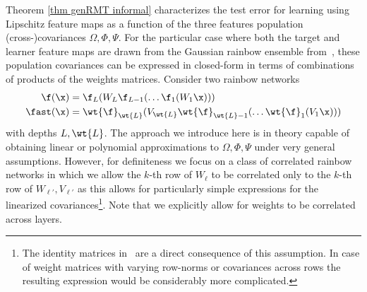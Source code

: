 Theorem \ref{thm genRMT informal} characterizes the test error for learning using Lipschitz feature maps as a function of the three features population (cross-)covariances $\Omega, \Phi, \Psi$. For the particular case where both the target and learner feature maps are drawn from the Gaussian rainbow ensemble from~, these population covariances can be expressed in closed-form in terms of combinations of products of the weights matrices. Consider two rainbow networks
\begin{equation}
    \begin{split}
    \f(\x)&=\f_L(W_L\f_{L-1}(\dots \f_1(W_1 \x)))\\
     \fast(\x)&=\wt{\f}_{\wt{L}}(V_{\wt{L}} \wt{\f}_{\wt{L}-1}(\dots \wt{\f}_1(V_1 \x)))
     \end{split}
\end{equation}
with depths $L,\wt{L}$. The approach we introduce here is in theory capable of obtaining linear or polynomial approximations to $\Omega,\Phi,\Psi$ under very general assumptions. However, for definiteness we focus on a class of correlated rainbow networks in which we allow the $k$-th row of $W_\ell$ to be correlated only to the $k$-th row of $W_{\ell'},V_{\ell'}$ as this allows for particularly simple expressions for the linearized covariances\footnote{The identity matrices in~ are a direct consequence of this assumption. In case of weight matrices with varying row-norms or covariances across rows the resulting expression would be considerably more complicated.}. Note that we explicitly allow for weights to be correlated across layers. 
